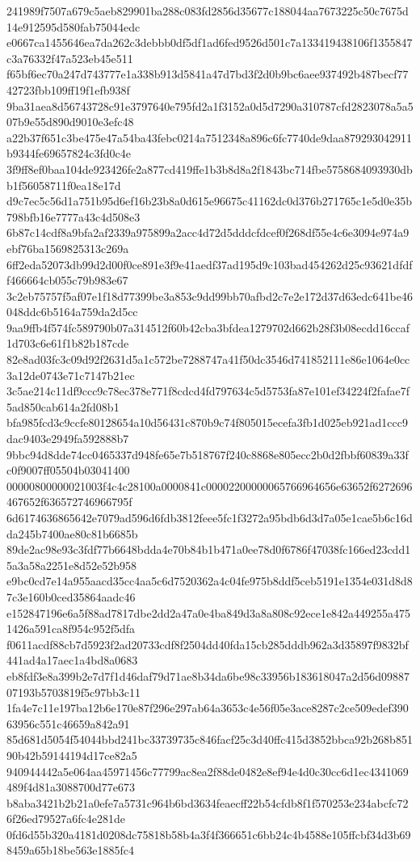 {241989f7507a679c5aeb829901ba288c083fd2856d35677c188044aa7673225c50c7675d14e912595d580fab75044edc
e0667ca1455646ea7da262c3debbb0df5df1ad6fed9526d501c7a133419438106f1355847c3a76332f47a523eb45e511
f65bf6ec70a247d743777e1a338b913d5841a47d7bd3f2d0b9bc6aee937492b487becf7742723fbb109ff19f1efb938f
9ba31aea8d56743728c91e3797640e795fd2a1f3152a0d5d7290a310787cfd2823078a5a507b9e55d890d9010e3efc48
a22b37f651c3be475e47a54ba43febc0214a7512348a896c6fc7740de9daa879293042911b9344fe69657824c3fd0c4e
3f9ff8ef0baa104de923426fe2a877cd419ffe1b3b8d8a2f1843bc714fbe5758684093930dbb1f56058711f0ea18e17d
d9c7ec5c56d1a751b95d6ef16b23b8a0d615e96675c41162dc0d376b271765c1e5d0e35b798bfb16e7777a43c4d508e3
6b87c14cdf8a9bfa2af2339a975899a2acc4d72d5dddcfdcef0f268df55e4c6e3094e974a9ebf76ba1569825313c269a
6ff2eda52073db99d2d00f0ce891e3f9e41aedf37ad195d9c103bad454262d25c93621dfdff466664cb055c79b983e67
3c2eb75757f5af07e1f18d77399be3a853c9dd99bb70afbd2c7e2e172d37d63edc641be46048ddc6b5164a759da2d5cc
9aa9ffb4f574fc589790b07a314512f60b42cba3bfdea1279702d662b28f3b08ecdd16ccaf1d703c6e61f1b82b187cde
82e8ad03fc3c09d92f2631d5a1c572be7288747a41f50dc3546d741852111e86e1064e0cc3a12de0743e71c7147b21ec
3c5ae214c11df9ccc9c78ec378e771f8cdcd4fd797634c5d5753fa87e101ef34224f2fafae7f5ad850cab614a2fd08b1
bfa985fcd3c9ccfe80128654a10d56431c870b9c74f805015ecefa3fb1d025eb921ad1ccc9dac9403e2949fa592888b7
9bbc94d8dde74cc0465337d948fe65e7b518767f240c8868e805ecc2b0d2fbbf60839a33fc0f9007ff05504b03041400
00000800000021003f4c4c28100a0000841c00002200000065766964656e63652f6272696467652f636572746966795f
6d6174636865642e7079ad596d6fdb3812feee5fc1f3272a95bdb6d3d7a05e1cae5b6c16dda245b7400ae80c81b6685b
89de2ac98e93c3fdf77b6648bdda4e70b84b1b471a0ee78d0f6786f47038fc166ed23cdd15a3a58a2251e8d52e52b958
e9bc0cd7e14a955aacd35cc4aa5c6d7520362a4c04fe975b8ddf5ceb5191e1354e031d8d87c3e160b0ced35864aadc46
e152847196e6a5f88ad7817dbe2dd2a47a0e4ba849d3a8a808c92ece1e842a449255a4751426a591ca8f954c952f5dfa
f0611acdf88cb7d5923f2ad20733cdf8f2504dd40fda15cb285dddb962a3d35897f9832bf441ad4a17aec1a4bd8a0683
eb8fdf3e8a399b2e7d7f1d46daf79d71ae8b34da6be98c33956b183618047a2d56d0988707193b5703819f5c97bb3c11
1fa4e7c11e197ba12b6e170e87f296e297ab64a3653c4e56f05e3ace8287c2ce509edef39063956c551c46659a842a91
85d681d5054f54044bbd241bc33739735c846facf25c3d40ffc415d3852bbca92b268b85190b42b59144194d17ce82a5
940944442a5e064aa45971456c77799ac8ea2f88de0482e8ef94e4d0c30cc6d1ec4341069489f4d81a3088700d77e673
b8aba3421b2b21a0efe7a5731c964b6bd3634feaecff22b54cfdb8f1f570253e234abcfc726f26ed79527a6fc4e281de
0fd6d55b320a4181d0208dc75818b58b4a3f4f366651c6bb24c4b4588e105ffcbf34d3b698459a65b18be563e1885fc4
}

